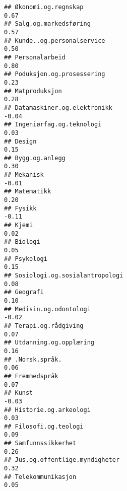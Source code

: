 \documentclass[
]{article}
\begin{document}
\begin{verbatim}
## Økonomi.og.regnskap                                                               0.67
## Salg.og.markedsføring                                                             0.57
## Kunde..og.personalservice                                                         0.50
## Personalarbeid                                                                    0.80
## Poduksjon.og.prosessering                                                         0.23
## Matproduksjon                                                                     0.28
## Datamaskiner.og.elektronikk                                                      -0.04
## Ingeniørfag.og.teknologi                                                          0.03
## Design                                                                            0.15
## Bygg.og.anlegg                                                                    0.30
## Mekanisk                                                                         -0.01
## Matematikk                                                                        0.20
## Fysikk                                                                           -0.11
## Kjemi                                                                             0.02
## Biologi                                                                           0.05
## Psykologi                                                                         0.15
## Sosiologi.og.sosialantropologi                                                    0.08
## Geografi                                                                          0.10
## Medisin.og.odontologi                                                            -0.02
## Terapi.og.rådgiving                                                               0.07
## Utdanning.og.opplæring                                                            0.16
## .Norsk.språk.                                                                     0.06
## Fremmedspråk                                                                      0.07
## Kunst                                                                            -0.03
## Historie.og.arkeologi                                                             0.03
## Filosofi.og.teologi                                                               0.09
## Samfunnssikkerhet                                                                 0.26
## Jus.og.offentlige.myndigheter                                                     0.32
## Telekommunikasjon                                                                 0.05

\end{verbatim}
\end{document}
